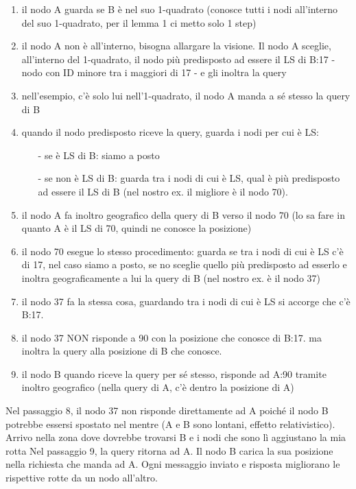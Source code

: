 \documentclass[12pt,italian]{report}
\begin{document}
\begin{enumerate}
    \item il nodo A guarda se B è nel suo 1-quadrato (conosce tutti i nodi all'interno del suo 1-quadrato, per il lemma 1 ci metto solo 1 step)
     \item il nodo A non è all'interno, bisogna allargare la visione. Il nodo A sceglie, all'interno del 1-quadrato, il nodo più predisposto ad essere il LS di B:17 - nodo con ID minore tra i maggiori di 17 - e gli inoltra la query
     \item nell'esempio, c'è solo lui nell'1-quadrato, il nodo A manda a sé stesso la query di B
     \item quando il nodo predisposto riceve la query, guarda i nodi per cui è LS:
        \begin{itemize}
            \item [-] se è LS di B: siamo a posto
            \item [-] se non è LS di B: guarda tra i nodi di cui è LS, qual è più predisposto ad essere il LS di B (nel nostro ex. il migliore è il nodo 70).
        \end{itemize}
    \item il nodo A fa inoltro geografico della query di B verso il nodo 70 (lo sa fare in quanto A è il LS di 70, quindi ne conosce la posizione)
    \item il nodo 70 esegue lo stesso procedimento: guarda se tra i nodi di cui è LS c'è di 17, nel caso siamo a posto, se no sceglie quello più predisposto ad esserlo e inoltra geograficamente a lui la query di B (nel nostro ex. è il nodo 37)
    \item il nodo 37 fa la stessa cosa, guardando tra i nodi di cui è LS si accorge che c'è B:17. 
    \item il nodo 37 NON risponde a 90 con la posizione che conosce di B:17. ma inoltra la query alla posizione di B che conosce.
    \item il nodo B quando riceve la query per sé stesso, risponde ad A:90 tramite inoltro geografico (nella query di A, c'è dentro la posizione di A)
\end{enumerate}
Nel passaggio 8, il nodo 37 non risponde direttamente ad A poiché il nodo B potrebbe essersi spostato nel mentre (A e B sono lontani, effetto relativistico). Arrivo nella zona dove dovrebbe trovarsi B e i nodi che sono lì aggiustano la mia rotta
\bigbreak
Nel passaggio 9, la query ritorna ad A. Il nodo B carica la sua posizione nella richiesta che manda ad A. Ogni messaggio inviato e risposta migliorano le rispettive rotte da un nodo all'altro.
\end{document}
